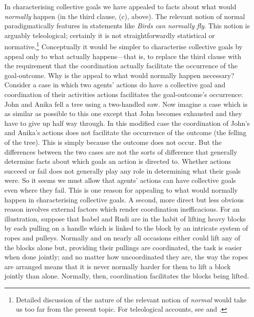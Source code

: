 \documentclass[12pt,a4paper]{extarticle}
\begin{document}
In characterising collective goals we have appealed to facts about what would \emph{normally} happen (in the third clause, (c), above).  
The relevant notion of normal paradigmatically features in statements like \emph{Birds can normally fly}.  
This notion is arguably teleological; certainly it is not  straightforwardly statistical or normative.\footnote{
Detailed discussion of the nature of the relevant notion of  \emph{normal} would take us too far from the present topic.
For teleological accounts, see 
	\citet[p.\ 33ff.]{Millikan:1984ib} and 
	\citet[p.\ 48ff.]{Price:2001hs}.
}
Conceptually it would be simpler to characterise collective goals by appeal only to what actually happens---that is, to replace the third clause with the requirement that the coordination actually facilitate the occurrence of the goal-outcome.  
Why is the appeal to what would normally happen necessary? 
Consider a case in which two agents' actions do have a collective goal and coordination of their activities actions facilitates the goal-outcome's occurrence: John and Anika fell a tree using a two-handled saw.  
Now imagine a case which is as similar as possible to this one except that John becomes exhausted and they have to give up half way through.  
In this modified case the coordination of John's and Anika's actions does not facilitate the occurrence of the outcome (the felling of the tree).
This is simply because the outcome does not occur.  
But the differences between the two cases are not the sorts of difference that generally determine facts about which goals an action is directed to.  
Whether actions succeed or fail does not generally play any role in determining what their goals were.
So it seems we must allow that agents' actions can have collective goals even where they fail.  
This is one reason for appealing to what would normally happen in characterising collective goals.  
A second, more direct but less obvious reason involves external factors which render coordination inefficacious.  For an illustration, suppose that Isabel and Rudi are in the habit of lifting heavy blocks by each pulling on a handle which is linked to the block by an intricate system of ropes and pulleys.  
Normally and on nearly all occasions either could lift any of the blocks alone but, providing their pullings are coordinated, the task is easier when done jointly;
and no matter how uncoordinated they are, the way the ropes are arranged means that it is never normally harder for them to lift a block jointly than alone.  
Normally, then, coordination facilitates the blocks being lifted.  
\end{document}
